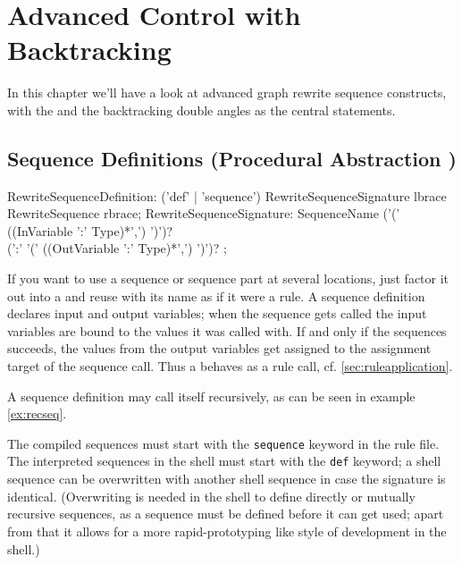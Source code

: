 \chapter{Advanced Control with Backtracking}\label{cha:transaction}

In this chapter we'll have a look at advanced graph rewrite sequence constructs,
with the  and the backtracking double angles as the central statements.


\section{Sequence Definitions (Procedural Abstraction )} \label{sec:sequencedefinition}
\begin{rail}
  RewriteSequenceDefinition: 
    ('def' | 'sequence') RewriteSequenceSignature lbrace RewriteSequence rbrace;
  RewriteSequenceSignature: 
    SequenceName ('(' ((InVariable ':' Type)*',') ')')? \\ (':' '(' ((OutVariable ':' Type)*',') ')')?
	;
\end{rail}

If you want to use a sequence or sequence part at several locations, just factor it out into a  and reuse with its name as if it were a rule.
A sequence definition declares input and output variables; 
when the sequence gets called the input variables are bound to the values it was called with.
If and only if the sequences succeeds, the values from the output variables get assigned to the assignment target of the sequence call.
Thus a  behaves as a rule call, cf. \ref{sec:ruleapplication}.

A sequence definition may call itself recursively, as can be seen in example \ref{ex:recseq}.

The compiled sequences must start with the \texttt{sequence} keyword in the rule file.
The interpreted sequences in the shell must start with the \texttt{def} keyword; a shell sequence can be overwritten with another shell sequence in case the signature is identical.
(Overwriting is needed in the shell to define directly or mutually recursive sequences, as a sequence must be defined before it can get used; apart from that it allows for a more rapid-prototyping like style of development in the shell.)

